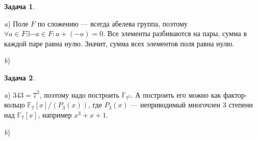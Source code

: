 \documentclass[12pt]{article}
\theoremstyle{definition}
\newtheorem{task}{Задача}
\begin{document}
\begin{task}
\textit{}

\textit{a}) Поле $F$ по сложению --- всегда абелева группа, поэтому $\forall a\in F \exists -a\in F: a+(-a)=0$. Все элементы разбиваются на пары, сумма в каждой паре равна нулю. Значит, сумма всех элементов поля равна нулю.  

\textit{b})

\end{task}









\begin{task}
\textit{}

\textit{a}) $343=7^3$, поэтому надо построить $\mathbb{F}_{7^3}$. А построить его можно как фактор-кольцо $\mathbb{F}_7[x]/(P_3(x))$, где $P_3(x)$ --- неприводимый многочлен 3 степени над $\mathbb{F}_7[x]$, например $x^3+x+1$.

\textit{b})

\end{task}
\end{document}
